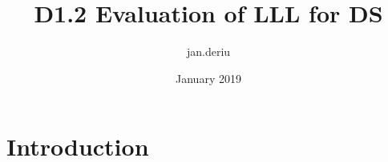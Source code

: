 \documentclass{article}
\title{D1.2 Evaluation of LLL for DS}
\author{jan.deriu }
\date{January 2019}
\begin{document}
\maketitle

\section{Introduction}
\end{document}
